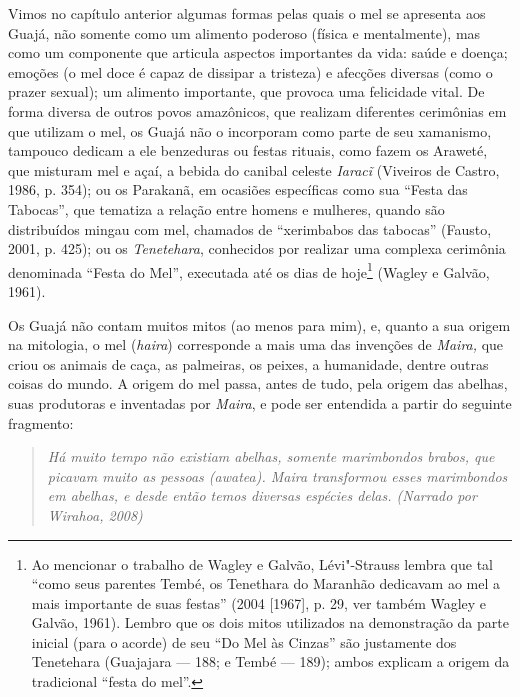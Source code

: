 Vimos no capítulo anterior algumas formas pelas quais o mel se apresenta
aos Guajá, não somente como um alimento poderoso (física e mentalmente),
mas como um componente que articula aspectos importantes da vida: saúde
e doença; emoções (o mel doce é capaz de dissipar a tristeza) e afecções
diversas (como o prazer sexual); um alimento importante, que provoca uma
felicidade vital. De forma diversa de outros povos amazônicos, que
realizam diferentes cerimônias em que utilizam o mel, os Guajá não o
incorporam como parte de seu xamanismo, tampouco dedicam a ele
benzeduras ou festas rituais, como fazem os Araweté, que misturam mel e
açaí, a bebida do canibal celeste \emph{Iaracĩ} (Viveiros de Castro,
1986, p. 354); ou os Parakanã, em ocasiões específicas como sua ``Festa
das Tabocas'', que tematiza a relação entre homens e mulheres, quando são
distribuídos mingau com mel, chamados de ``xerimbabos das tabocas''
(Fausto, 2001, p. 425); ou os \emph{Tenetehara}, conhecidos por realizar
uma complexa cerimônia denominada ``Festa do Mel'', executada até os dias
de hoje\footnote{Ao mencionar o trabalho de Wagley e Galvão,
  Lévi"-Strauss lembra que tal ``como seus parentes Tembé, os Tenethara do
  Maranhão dedicavam ao mel a mais importante de suas festas'' (2004 {[}1967{]}, p. 29, ver também Wagley e Galvão, 1961). Lembro que os dois
  mitos utilizados na demonstração da parte inicial (para o acorde) de
  seu ``Do Mel às Cinzas'' são justamente dos Tenetehara (Guajajara ---
  188; e Tembé --- 189); ambos explicam a origem da tradicional ``festa
  do mel''.} (Wagley e Galvão, 1961).

Os Guajá não contam muitos mitos (ao menos para mim), e, quanto a sua
origem na mitologia, o mel (\emph{haira}) corresponde a mais uma das
invenções de \emph{Maira,} que criou os animais de caça, as palmeiras,
os peixes, a humanidade, dentre outras coisas do mundo. A origem do mel
passa, antes de tudo, pela origem das abelhas, suas produtoras e
inventadas por \emph{Maira}, e pode ser entendida a partir do seguinte
fragmento:

\begin{quote}
\emph{Há muito tempo não existiam abelhas, somente marimbondos \emph{brabos},
que picavam muito as pessoas (\emph{awatea}). \emph{Maira} transformou
esses marimbondos em abelhas, e desde então temos diversas espécies
delas. (Narrado por Wirahoa, 2008)}
\end{quote}

